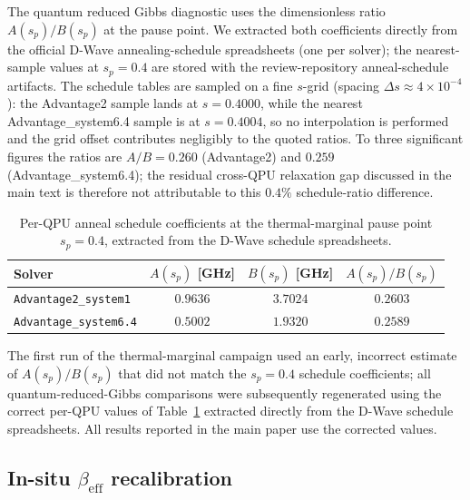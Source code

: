 \documentclass[aps,prapplied,reprint,superscriptaddress,floatfix,nofootinbib]{revtex4-2}
\begin{document}
The quantum reduced Gibbs diagnostic uses the dimensionless ratio
$A(s_p)/B(s_p)$ at the pause point.  We extracted both coefficients
directly from the official D-Wave annealing-schedule spreadsheets
(one per solver); the nearest-sample values at $s_p=0.4$ are stored
with the review-repository anneal-schedule artifacts.  The schedule
tables are sampled on a fine $s$-grid (spacing $\Delta s\approx 4\times
10^{-4}$): the Advantage2 sample lands at $s=0.4000$, while the nearest
Advantage\_system6.4 sample is at $s=0.4004$, so no interpolation is
performed and the grid offset contributes negligibly to the quoted
ratios.  To three significant figures the ratios are $A/B=0.260$
(Advantage2) and $0.259$ (Advantage\_system6.4); the residual cross-QPU
relaxation gap discussed in the main text is therefore not attributable
to this $0.4\%$ schedule-ratio difference.

\begin{table}[!htbp]
\centering
\caption{Per-QPU anneal schedule coefficients at the thermal-marginal pause
point $s_p=0.4$, extracted from the D-Wave schedule spreadsheets.}
\label{tab:phase6_schedule}
\begin{tabular}{lccc}
\toprule
Solver & $A(s_p)$ [GHz] & $B(s_p)$ [GHz] & $A(s_p)/B(s_p)$ \\
\midrule
\texttt{Advantage2\_system1} & $0.9636$ & $3.7024$ & $0.2603$ \\
\texttt{Advantage\_system6.4} & $0.5002$ & $1.9320$ & $0.2589$ \\
\bottomrule
\end{tabular}
\end{table}

The first run of the thermal-marginal campaign used an early, incorrect
estimate of $A(s_p)/B(s_p)$ that did not match the $s_p=0.4$ schedule
coefficients; all quantum-reduced-Gibbs comparisons were subsequently
regenerated using the correct per-QPU values of
Table~\ref{tab:phase6_schedule} extracted directly from the D-Wave
schedule spreadsheets.  All results reported in the main paper use the
corrected values.

\subsection{In-situ $\beta_\mathrm{eff}$ recalibration}
\label{sec:phase6_beta}
\end{document}
